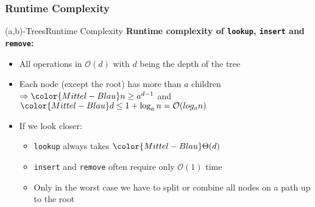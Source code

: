 
\subsubsection{Runtime Complexity}

\begin{frame}{(a,b)-Trees}{Runtime Complexity}
  \textbf{Runtime complexity of \texttt{\color{Mittel-Blau}lookup},
    \texttt{\color{Mittel-Blau}insert} and \texttt{\color{Mittel-Blau}remove}:}
  \begin{itemize}
    \item
      All operations in {\color{Mittel-Blau}$\mathcal{O}(d)$} with
      {\color{Mittel-Blau}$d$} being the depth of the tree
    \item
      Each node (except the root) has more than {\color{Mittel-Blau}$a$}
      children\\
      \begin{math}
        \Rightarrow
        \color{Mittel-Blau}
        n \geq a^{d-1}
      \end{math}
      and
      \begin{math}
        \color{Mittel-Blau}
        d \leq 1 + \log_a n = \mathcal{O}(log_a n)
      \end{math}
    \item
      If we look closer:
      \begin{itemize}
        \item
          \texttt{\color{Mittel-Blau}lookup} always takes
          \begin{math}
            \color{Mittel-Blau}
            \Theta(d)
          \end{math}
        \item
          \texttt{\color{Mittel-Blau}insert} and
          \texttt{\color{Mittel-Blau}remove}
          often require only $\mathcal{O}(1)$ time
        \item
          Only in the {\color{Mittel-Blau}worst case} we have to
          {\color{Mittel-Blau}split} or
          {\color{Mittel-Blau}combine} all nodes on a path up to the root
      \end{itemize}
  \end{itemize}
\end{frame}


